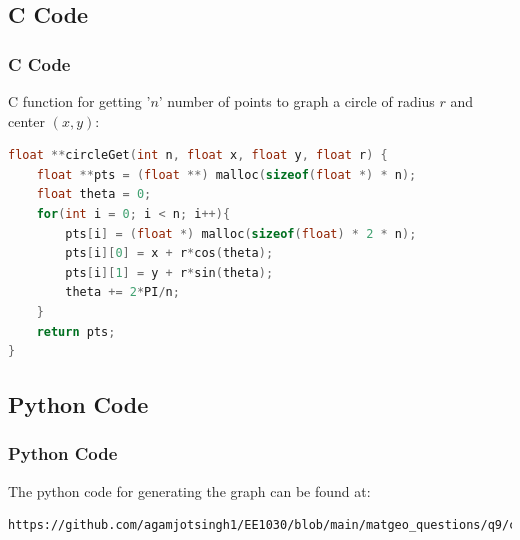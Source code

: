 \documentclass{beamer}
\providecommand{\brak}[1]{\ensuremath{\left(#1\right)}}
\theoremstyle{remark}
\numberwithin{equation}{section}
\begin{document}
\subsection{C Code}
\begin{frame}[fragile]
\frametitle{C Code}

C function for getting '$n$' number of points to graph a circle of radius $r$ and center $\brak{x, y}$:

\begin{lstlisting}[language=C]
float **circleGet(int n, float x, float y, float r) {
    float **pts = (float **) malloc(sizeof(float *) * n); 
    float theta = 0;
    for(int i = 0; i < n; i++){
        pts[i] = (float *) malloc(sizeof(float) * 2 * n);
        pts[i][0] = x + r*cos(theta);
        pts[i][1] = y + r*sin(theta);
        theta += 2*PI/n;
    }
    return pts;
}
\end{lstlisting}

\end{frame}

\subsection{Python Code}
\begin{frame}[fragile]
\frametitle{Python Code}

The python code for generating the graph can be found at:
\begin{lstlisting}
https://github.com/agamjotsingh1/EE1030/blob/main/matgeo_questions/q9/codes/graph.py
\end{lstlisting}

\end{frame}
\end{document}
